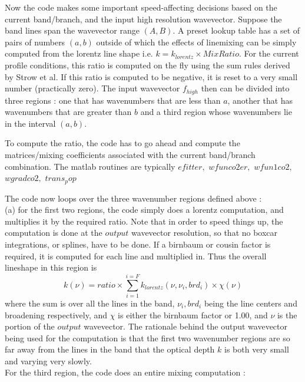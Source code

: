 \documentclass[11pt]{article}
\begin{document}
Now the code makes some important speed-affecting decisions based
on the current band/branch, and the input high resolution wavevector.
Suppose the band lines span the wavevector range $(A,B)$. A preset
lookup table has a set of pairs of numbers $(a,b)$ outside of which the 
effects of linemixing can be simply computed from the lorentz line shape 
i.e. $k = k_{lorentz} \times MixRatio$. For the current profile 
conditions, this 
ratio is computed on the fly using the sum rules derived by Strow et al. 
If this ratio is computed to be negative, it is reset to a very small number
(practically zero). The input wavevector $f_{high}$ then can be divided 
into three regions : one that has wavenumbers 
that are less than $a$, another that has wavenumbers that are greater than 
$b$ and a third region whose wavenumbers lie in the interval $(a,b)$.

To compute the  ratio, the code has to go ahead and compute the 
matrices/mixing coefficients associated with the current band/branch 
combination. The matlab routines are typically $efitter,$ $wfunco2er,$ 
$wfun1co2,$ $wgradco2,$ $trans_pop$

The code now loops over the three wavenumber regions defined above :\\
(a) for the first two regions, the code simply does a lorentz computation, 
    and multiplies it by the required ratio. Note that in order to speed 
    things up, the computation is done at the $output$ wavevector 
    resolution, so that no boxcar integrations, or splines, have to be 
    done. If a birnbaum or cousin factor is required, it is computed for 
    each line and multiplied in. Thus the overall lineshape in this 
    region is
    \begin{equation}
 k(\nu) = ratio \times \sum_{i=1}^{i=F} k_{lorentz}(\nu,\nu_{i},brd_{i}) 
 \times \chi(\nu)
  \end{equation}
   where the sum is over all the lines in the band, $\nu_{i},brd_{i}$ 
   being the line centers and broadening respectively, and $\chi$ is 
   either the birnbaum factor or 1.00, and $\nu$ is the portion of the 
   $output$ wavevector. The rationale behind the output wavevector being 
   used for the computation is that the first two wavenumber regions are 
   so far away from the lines in the band that the optical depth $k$ is 
   both very small and varying very slowly.\\
  For the third region, the code does an entire mixing computation : \\
\end{document}

